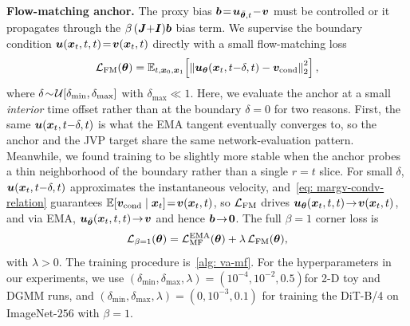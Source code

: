 \begin{appendices}
    \noindent\textbf{Flow-matching anchor.} The proxy bias ${\bm{b}}\!=\!{\bm{u}}_{\bar{{\bm{\theta}}},t}\!-\!{\bm{v}}$ must be controlled or it propagates through the $\beta\,({\bm{J}}{+}{\bm{I}}){\bm{b}}$ bias term. We supervise the boundary condition ${\bm{u}}({\bm{x}}_{t},t,t)\!=\!{\bm{v}}({\bm{x}}_{t},t)$ directly with a small flow-matching loss
    \begin{equation}
        {\mathcal{L}}_{\text{FM}}({\bm{\theta}})=\mathbb{E}_{t,{\bm{x}}_{0},{\bm{x}}_{1}}\!\left[\left\|{\bm{u}}_{{\bm{\theta}}}({\bm{x}}_{t},t{-}\delta,t)-{\bm{v}}_{\text{cond}}\right\|_{2}^{2}\right],
        \label{eq: fm-anchor}
    \end{equation}
    where $\delta\!\sim\!{\mathcal{U}}[\delta_{\min},\delta_{\max}]$ with $\delta_{\max}\!\ll\!1$. Here, we evaluate the anchor at a small \emph{interior} time offset rather than at the boundary $\delta\!=\!0$ for two reasons. First, the same ${\bm{u}}({\bm{x}}_{t},t{-}\delta,t)$ is what the EMA tangent eventually converges to, so the anchor and the JVP target share the same network-evaluation pattern. Meanwhile, we found training to be slightly more stable when the anchor probes a thin neighborhood of the boundary rather than a single $r\!=\!t$ slice. For small $\delta$, ${\bm{u}}({\bm{x}}_{t},t{-}\delta,t)$ approximates the instantaneous velocity, and~\eqref{eq: margv-condv-relation} guarantees $\mathbb{E}[{\bm{v}}_{\text{cond}}\mid{\bm{x}}_{t}]\!=\!{\bm{v}}({\bm{x}}_{t},t)$, so ${\mathcal{L}}_{\text{FM}}$ drives ${\bm{u}}_{{\bm{\theta}}}({\bm{x}}_{t},t,t)\!\to\!{\bm{v}}({\bm{x}}_{t},t)$, and via EMA, ${\bm{u}}_{\bar{{\bm{\theta}}}}({\bm{x}}_{t},t,t)\!\to\!{\bm{v}}$ and hence ${\bm{b}}\!\to\!\bm{0}$. The full $\beta\!=\!1$ corner loss is
    \begin{equation}
        {\mathcal{L}}_{\beta=1}({\bm{\theta}})={\mathcal{L}}_{\text{MF}}^{\text{EMA}}({\bm{\theta}})+\lambda\,{\mathcal{L}}_{\text{FM}}({\bm{\theta}}),
        \label{eq: vamf-obj}
    \end{equation}
    with $\lambda\!>\!0$. The training procedure is~\cref{alg: va-mf}. For the hyperparameters in our experiments, we use $(\delta_{\min},\delta_{\max},\lambda)\!=\!(10^{-4},10^{-2},0.5) $for 2-D toy and DGMM runs, and $(\delta_{\min},\delta_{\max},\lambda)\!=\!(0,10^{-3},0.1)$ for training the DiT-B/4 on ImageNet-$256$ with $\beta\!=\!1$.

    


\end{appendices}
